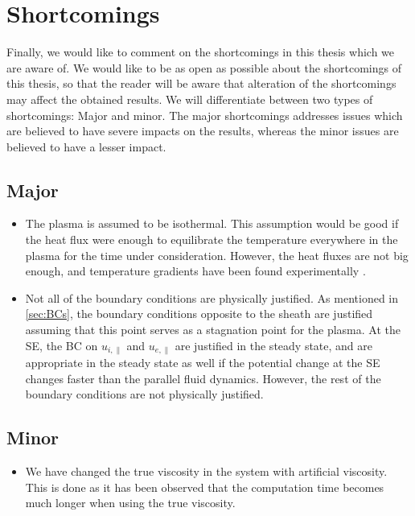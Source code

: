 \section{Shortcomings}
\label{app:shortcomings}
%
Finally, we would like to comment on the shortcomings in this thesis which we are aware of.
We would like to be as open as possible about the shortcomings of this thesis, so that the reader will be aware that alteration of the shortcomings may affect the obtained results.
We will differentiate between two types of shortcomings:
Major and minor.
The major shortcomings addresses issues which are believed to have severe impacts on the results, whereas the minor issues are believed to have a lesser impact.

\subsection{Major}
\begin{itemize}[noitemsep,nolistsep]
    \item The plasma is assumed to be isothermal.
        This assumption would be good if the heat flux were enough to equilibrate the temperature everywhere in the plasma for the time under consideration.
        However, the heat fluxes are not big enough, and temperature gradients have been found experimentally \cite{Schroder2003Phd}.
    \item Not all of the boundary conditions are physically justified.
        As mentioned in \cref{sec:BCs}, the boundary conditions opposite to the sheath are justified assuming that this point serves as a stagnation point for the plasma.
        At the SE, the BC on $u_{i,\|}$ and $u_{e,\|}$ are justified in the steady state, and are appropriate in the steady state as well if the potential change at the SE changes faster than the parallel fluid dynamics.
        However, the rest of the boundary conditions are not physically justified.
\end{itemize}

\subsection{Minor}
\begin{itemize}[noitemsep,nolistsep]
    \item We have changed the true viscosity in the system with artificial viscosity.
        This is done as it has been observed that the computation time becomes much longer when using the true viscosity.
\end{itemize}
